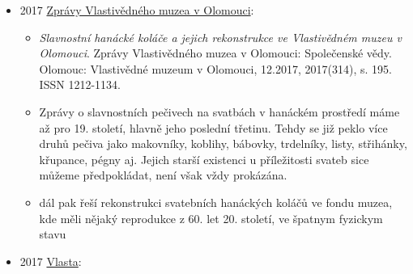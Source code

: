 \begin{itemize}
  \begin{itemize}
  \tightlist
  \item
    popisuje různý typy a kategorizuje
  \item
    taky blog:

    \begin{itemize}
    \tightlist
    \item
      \href{https://diybaumkuchen.blogspot.com/2015/06/1581-82-was-boom-year-for-cake.html}{recept
      na Spiesskuchen z roku 1581}
    \item
      \href{https://diybaumkuchen.blogspot.com/2015/08/the-family-tree.html}{Popis
      různejch druhů dortů}
    \end{itemize}
  \end{itemize}
\item
  2017 \href{https://www.vmo.cz/download/451/ZVMO_2017_314.pdf}{Zprávy
  Vlastivědného muzea v Olomouci}:

  \begin{itemize}
  \tightlist
  \item
     \emph{Slavnostní hanácké koláče a
    jejich rekonstrukce ve Vlastivědném muzeu v Olomouci}. Zprávy
    Vlastivědného muzea v Olomouci: Společenské vědy. Olomouc:
    Vlastivědné muzeum v Olomouci, 12.2017, 2017(314), s. 195. ISSN
    1212-1134.
  \item
    Zprávy o slavnostních pečivech na svatbách v hanáckém prostředí máme
    až pro 19. století, hlavně jeho poslední třetinu. Tehdy se již peklo
    více druhů pečiva jako makovníky, koblihy, bábovky, trdelníky,
    listy, střihánky, křupance, pégny aj. Jejich starší existenci u
    příležitosti svateb sice můžeme předpokládat, není však vždy
    prokázána.
  \item
    dál pak řeší rekonstrukci svatebních hanáckých koláčů ve fondu
    muzea, kde měli nějaký reprodukce z 60. let 20. století, ve špatnym
    fyzickym stavu
  \end{itemize}
\item
  2017
  \href{https://www.digitalniknihovna.cz/mzk/uuid/uuid:4d932520-fc58-11e7-9854-5ef3fc9ae867}{Vlasta}:


\end{itemize}
